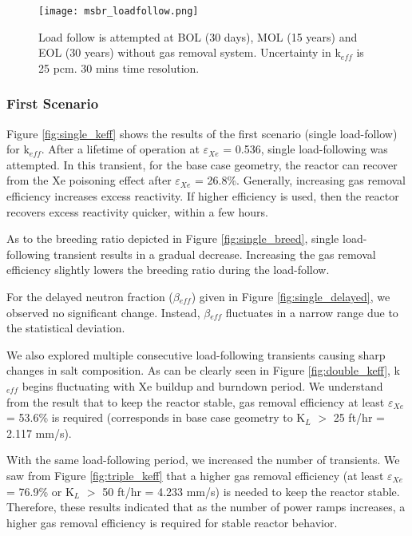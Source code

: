 \begin{itemize}
    \begin{figure}[h]
        \begin{center}
            \texttt{[image: msbr\_loadfollow.png]}
        \end{center}
        \caption{Load follow is attempted at BOL (30 days), MOL (15 years) and 
            EOL (30 years) without gas removal system. Uncertainty in k$_{eff}$ 
            is 25 pcm. 30 mins time resolution.}
        \label{fig:loadfollow}
    \end{figure}

\subsubsection{First Scenario}

    Figure \ref{fig:single_keff} shows the results of the first scenario 
    (single load-follow) for k$_{eff}$. After a lifetime of operation at 
    $\varepsilon$$_{Xe}$ = 0.536, single load-following was attempted. In this 
    transient, for the base case geometry, the reactor can recover from the Xe 
    poisoning effect after $\varepsilon$$_{Xe}$ = 26.8\%. Generally, increasing 
    gas removal efficiency increases excess reactivity. If higher efficiency is 
    used, then the reactor recovers excess reactivity quicker, within a few 
    hours.

    As to the breeding ratio depicted in Figure \ref{fig:single_breed}, single 
    load-following transient results in a gradual decrease. Increasing the gas 
    removal efficiency slightly lowers the breeding ratio during the 
    load-follow.

    For the delayed neutron fraction ($\beta$$_{eff}$) given in Figure 
    \ref{fig:single_delayed}, we observed no significant change. Instead, 
    $\beta$$_{eff}$ fluctuates in a narrow range due to the statistical 
    deviation.

    We also explored multiple consecutive load-following transients causing sharp 
    changes in salt composition. As can be clearly seen in Figure 
    \ref{fig:double_keff}, k$_{eff}$ begins fluctuating with Xe buildup and 
    burndown period. We understand from the result that to keep the reactor 
    stable, gas removal efficiency at least $\varepsilon$$_{Xe}$ = 53.6\% is 
    required (corresponds in base case geometry to K$_{L}$ $>$ 25 ft/hr = 2.117 
    mm/s).

    With the same load-following period, we increased the number of transients. We 
    saw from Figure \ref{fig:triple_keff} that a higher gas removal efficiency 
    (at least $\varepsilon$$_{Xe}$ = 76.9\% or K$_{L}$ $>$ 50 ft/hr = 4.233 
    mm/s) is needed to keep the reactor stable. Therefore, these results 
    indicated that as the number of power ramps increases, a higher gas removal 
    efficiency is required for stable reactor behavior.


\end{itemize}
